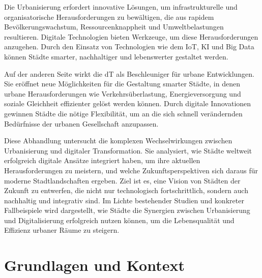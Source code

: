 \documentclass[conference,compsoc,final,a4paper, onecolumn, 11pt]{IEEEtran}
\begin{document}
Die Urbanisierung erfordert innovative Lösungen, um infrastrukturelle und organisatorische Herausforderungen zu bewältigen, die aus rapidem Bevölkerungswachstum, Ressourcenknappheit und Umweltbelastungen resultieren. 
Digitale Technologien bieten Werkzeuge, um diese Herausforderungen anzugehen. Durch den Einsatz von Technologien wie dem \ac{IoT}, \ac{KI} und Big Data können Städte smarter, nachhaltiger und lebenswerter gestaltet werden.

Auf der anderen Seite wirkt die \ac{dT} als Beschleuniger für urbane Entwicklungen. 
Sie eröffnet neue Möglichkeiten für die Gestaltung smarter Städte, in denen urbane Herausforderungen wie Verkehrsüberlastung, Energieversorgung und soziale Gleichheit effizienter gelöst werden können. Durch digitale Innovationen gewinnen Städte die nötige Flexibilität, um an die sich schnell verändernden Bedürfnisse der urbanen Gesellschaft anzupassen.

Diese Abhandlung untersucht die komplexen Wechselwirkungen zwischen Urbanisierung und digitaler Transformation. 
Sie analysiert, wie Städte weltweit erfolgreich digitale Ansätze integriert haben, um ihre aktuellen Herausforderungen zu meistern, und welche Zukunftsperspektiven sich daraus für moderne Stadtlandschaften ergeben. 
Ziel ist es, eine Vision von Städten der Zukunft zu entwerfen, die nicht nur technologisch fortschrittlich, sondern auch nachhaltig und integrativ sind. 
Im Lichte bestehender Studien und konkreter Fallbeispiele wird dargestellt, wie Städte die Synergien zwischen Urbanisierung und Digitalisierung erfolgreich nutzen können, um die Lebensqualität und Effizienz urbaner Räume zu steigern.


\section{Grundlagen und Kontext}
\end{document}
